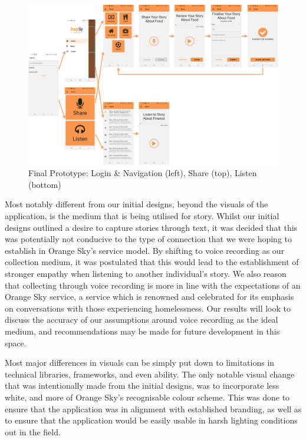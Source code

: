 \begin{figure}[ht!]
    \centering
    \includegraphics[width=\textwidth]{assets/designs/20200831-mockups.png}
    \caption{Final Prototype: Login \& Navigation (left), Share (top), Listen (bottom)}
    \label{finalprototype}
\end{figure}

Most notably different from our initial designs, beyond the visuals of the application, is the medium that is being utilised for story. Whilst our initial designs outlined a desire to capture stories through text, it was decided that this was potentially not conducive to the type of connection that we were hoping to establish in Orange Sky's service model. By shifting to voice recording as our collection medium, it was postulated that this would lead to the establishment of stronger empathy when listening to another individual's story. We also reason that collecting through voice recording is more in line with the expectations of an Orange Sky service, a service which is renowned and celebrated for its emphasis on conversations with those experiencing homelessness. Our results will look to discuss the accuracy of our assumptions around voice recording as the ideal medium, and recommendations may be made for future development in this space.

Most major differences in visuals can be simply put down to limitations in technical libraries, frameworks, and even ability. The only notable visual change that was intentionally made from the initial designs, was to incorporate less white, and more of Orange Sky's recognisable colour scheme. This was done to ensure that the application was in alignment with established branding, as well as to ensure that the application would be easily usable in harsh lighting conditions out in the field.

